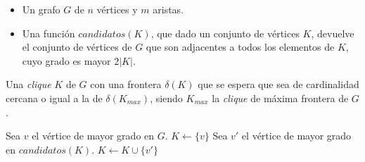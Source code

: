 \begin{pseudocodigo}
    \Require\Statex
        \begin{itemize}
            \item Un grafo $G$ de $n$ v\'ertices y $m$ aristas.

            \item Una funci\'on $candidatos(K)$, que dado un conjunto de v\'ertices
                $K$, devuelve el conjunto de v\'ertices de $G$ que son adjacentes
                a todos los elementos de $K$, cuyo grado es mayor $2|K|$.
        \end{itemize}

    \Statex

    \Ensure Una \emph{clique} $K$ de $G$ con una frontera $\delta(K)$ que se
        espera que sea de cardinalidad cercana o igual a la de $\delta(K_{max})$,
        siendo $K_{max}$ la \emph{clique} de m\'axima frontera de $G$.

    \Statex

    \State Sea $v$ el v\'ertice de mayor grado en $G$.
    \State $K \gets \{v\}$
        \State Sea $v'$ el v\'ertice de mayor grado en $candidatos(K)$.
        \State $K \gets K \cup \{v'\}$
    \EndWhile

    \State {}
\end{pseudocodigo}

\begin{comment}
    \begin{pseudocodigo}[Heur\'istica Golosa Constructiva 2 para \emph{CMF} - Descriptivo]
        \Require Un grafo $G$ de $n$ v\'ertices y $m$ aristas.
        \Ensure Una \emph{clique} $K$ de $G$ con una frontera $\delta(K)$ que se
            espera que sea de cardinalidad cercana o igual a la de $\delta(K')$,
            siendo $K'$ la \emph{clique} de m\'axima frontera de $G$.

        \Statex

        \State $K \gets \emptyset$
        \State $\delta_{max} \gets 0$
        \State $Ks \gets $ Todos los conjuntos de 2 o 3 v\'ertices de $G$ que
            forman una \emph{clique}.
        \ForEach{$K' \in Ks$}
            \If{$\delta(K') > \delta_{max}$}
                \State $\delta_{max} \gets \delta(K')$
                \State $K \gets K'$

            \EndIf

        \EndForEach

        \State \Return{$K$}
    \end{pseudocodigo}
\end{comment}
